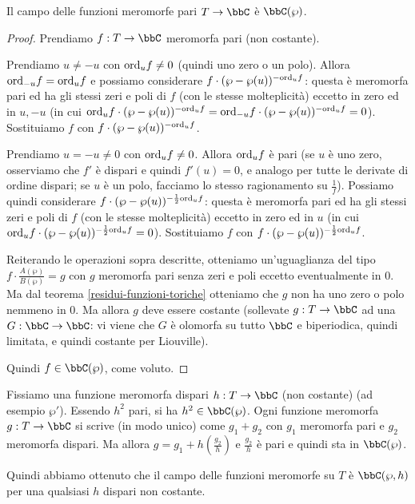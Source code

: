 \begin{teorema}
Il campo delle funzioni meromorfe pari $T\rar\bbC$ è $\bbC(\wp)$.
\end{teorema}
\begin{proof}
Prendiamo $f:T\rar\bbC$ meromorfa pari (non costante).

Prendiamo $u\not=-u$ con $\text{ord}_uf\not=0$ (quindi uno zero o un polo). Allora $\text{ord}_{-u}f=\text{ord}_uf$ e possiamo considerare $f\cdot(\wp-\wp(u))^{-\text{ord}_uf}$:
questa è meromorfa pari ed ha gli stessi zeri e poli di $f$ (con le stesse molteplicità) eccetto
in zero ed in $u,-u$ (in cui $\text{ord}_uf\cdot(\wp-\wp(u))^{-\text{ord}_uf}=\text{ord}_{-u}f\cdot(\wp-\wp(u))^{-\text{ord}_uf}=0$).
Sostituiamo $f$ con $f\cdot(\wp-\wp(u))^{-\text{ord}_uf}$.

Prendiamo $u=-u\not=0$ con $\text{ord}_uf\not=0$. Allora $\text{ord}_uf$ è pari (se $u$ è uno zero, osserviamo che $f'$ è dispari e quindi $f'(u)=0$, e analogo per tutte le derivate di ordine dispari;
se $u$ è un polo, facciamo lo stesso ragionamento su $\frac{1}{f}$). Possiamo quindi considerare $f\cdot(\wp-\wp(u))^{-\frac{1}{2}\text{ord}_uf}$:
questa è meromorfa pari ed ha gli stessi zeri e poli di $f$ (con le stesse molteplicità) eccetto in zero ed in $u$ (in cui $\text{ord}_uf\cdot(\wp-\wp(u))^{-\frac{1}{2}\text{ord}_uf}=0$).
Sostituiamo $f$ con $f\cdot(\wp-\wp(u))^{-\frac{1}{2}\text{ord}_uf}$.

Reiterando le operazioni sopra descritte, otteniamo un'uguaglianza del tipo $f\cdot\frac{A(\wp)}{B(\wp)}=g$ con $g$ meromorfa pari senza zeri e poli eccetto eventualmente in $0$.
Ma dal teorema \ref{residui-funzioni-toriche} otteniamo che $g$ non ha uno zero o polo nemmeno in $0$. Ma allora $g$ deve essere costante
(sollevate $g:T\rar\bbC$ ad una $G:\bbC\rar\bbC$: vi viene che $G$ è olomorfa su tutto $\bbC$ e biperiodica, quindi limitata, e quindi costante per Liouville).

Quindi $f\in\bbC(\wp)$, come voluto.
\end{proof}


Fissiamo una funzione meromorfa dispari $h:T\rar\bbC$ (non costante) (ad esempio $\wp'$).
Essendo $h^2$ pari, si ha $h^2\in\bbC(\wp)$.
Ogni funzione meromorfa $g:T\rar\bbC$ si scrive (in modo unico) come $g_1+g_2$ con $g_1$ meromorfa pari e $g_2$ meromorfa dispari.
Ma allora $g=g_1+h(\frac{g_2}{h})$ e $\frac{g_2}{h}$ è pari e quindi sta in $\bbC(\wp)$.

Quindi abbiamo ottenuto che il campo delle funzioni meromorfe su $T$ è $\bbC(\wp,h)$ per una qualsiasi $h$ dispari non costante.


